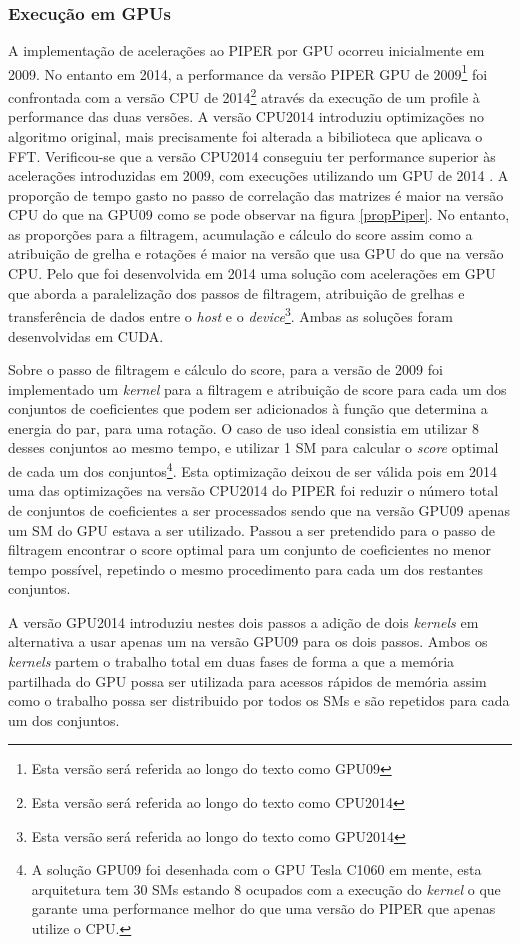  \subsubsection{Execução em GPUs}
 A implementação de acelerações ao PIPER\cite{piper2009gpu} por GPU ocorreu inicialmente em 2009. No entanto em 2014, a performance da versão PIPER GPU de 2009\footnote[6]{Esta versão será referida ao longo do texto como GPU09} foi confrontada com a versão CPU de 2014\footnote[7]{Esta versão será referida ao longo do texto como CPU2014} através da execução de um profile à performance das duas versões. A versão CPU2014 introduziu optimizações no algoritmo original, mais precisamente foi alterada a bibilioteca que aplicava o FFT. Verificou-se que a versão CPU2014 conseguiu ter performance superior às acelerações introduzidas em 2009, com execuções utilizando um GPU de 2014 \cite{piper2014gpu}. A proporção de tempo gasto no passo de correlação das matrizes é maior na versão CPU do que na GPU09 como se pode observar na figura \ref{propPiper}. No entanto, as proporções para a filtragem, acumulação e cálculo do score assim como a atribuição de grelha e rotações é maior na versão que usa GPU do que na versão CPU. Pelo que foi desenvolvida em 2014  uma solução com acelerações em GPU que aborda a paralelização dos passos de filtragem, atribuição de grelhas e transferência de dados entre o \textit{host} e o \textit{device}\footnote[8]{Esta versão será referida ao longo do texto como GPU2014}. Ambas as soluções foram desenvolvidas em CUDA. \par
 Sobre o passo de filtragem e cálculo do score, para a versão de 2009 foi implementado um \textit{kernel} para a filtragem e atribuição de score para cada um dos conjuntos de coeficientes que podem ser adicionados à função que determina a energia do par, para uma rotação. O caso de uso ideal consistia em utilizar 8 desses conjuntos ao mesmo tempo, e utilizar 1 SM para calcular o \textit{score} optimal de cada um dos conjuntos\footnote[9]{A solução GPU09 foi desenhada com o GPU Tesla C1060 em mente, esta arquitetura tem 30 SMs estando 8 ocupados com a execução do \textit{kernel} o que garante uma performance melhor do que uma versão do PIPER que apenas utilize o CPU.}. Esta optimização deixou de ser válida pois em 2014 uma das optimizações na versão CPU2014 do PIPER foi reduzir o número total de conjuntos de coeficientes a ser processados sendo que na versão GPU09 apenas um SM do GPU estava a ser utilizado. Passou a ser pretendido para o passo de filtragem encontrar o score optimal para um conjunto de coeficientes no menor tempo possível, repetindo o mesmo procedimento para cada um dos restantes conjuntos.\par A versão GPU2014 introduziu nestes dois passos a adição de dois \textit{kernels} em alternativa a usar apenas um na versão GPU09 para os dois passos. Ambos os \textit{kernels} partem o trabalho total em duas fases de forma a que a memória partilhada do GPU possa ser utilizada para acessos rápidos de memória assim como o trabalho possa ser distribuido por todos os SMs e são repetidos para cada um dos conjuntos. \par
